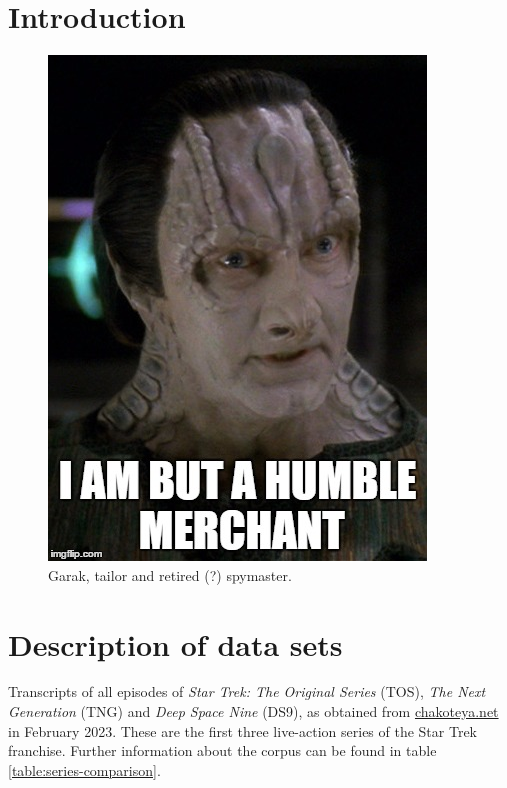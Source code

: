 


\usepackage{booktabs}

\section{Introduction}
\label{sec:papertag.introduction}

\begin{figure}[tp!]
  \centering
    \includegraphics[width=0.5\columnwidth]{figures/localized/Garak.jpg}
  \caption{
    Garak, tailor and retired (?) spymaster.
  }
  \label{fig:papertag.}
\end{figure}

\section{Description of data sets}
\label{sec:papertag.data}

Transcripts of all episodes of \textit{Star Trek: The Original Series} (TOS), \textit{The Next Generation} (TNG) and \textit{Deep Space Nine} (DS9), as obtained from \href{http://chakoteya.net/StarTrek/index.html}{chakoteya.net} in February 2023. These are the first three live-action series of the Star Trek franchise. Further information about the corpus can be found in table \ref{table:series-comparison}.

